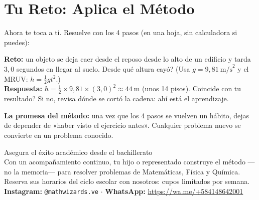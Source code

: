 \documentclass[12pt, letterpaper]{article}
\makeatletter
\newcommand{\mwcta}[2]{%
  \begin{center}
    \begin{minipage}{0.94\linewidth}
      \begin{cuadroextra}
        \centering
        {\nxheav\Large\color{mwprimario}#1}\\[8pt]
        {\small #2}\\[12pt]
        {\footnotesize\color{mwgris}
          \textbf{Instagram:} \texttt{@mathwizards.ve} \quad$\cdot$\quad
          \textbf{WhatsApp:} \url{https://wa.me/+584148642001}}
      \end{cuadroextra}
    \end{minipage}
  \end{center}
}
\makeatother
\begin{document}
\section{Tu Reto: Aplica el Método}

\noindent Ahora te toca a ti. Resuelve con los 4 pasos (en una hoja, sin calculadora si puedes):

\begin{cuadroextra}
  \small
  \textbf{Reto:} un objeto se deja caer desde el reposo desde lo alto de un edificio y tarda $3{,}0$ segundos en llegar al suelo. \textquestiondown Desde qué altura cayó? (Usa $g = 9{,}81\ \text{m/s}^2$ y el MRUV: $h = \tfrac{1}{2} g t^2$.)
  \\[4pt]
  \textbf{Respuesta:} $h = \tfrac{1}{2} \times 9{,}81 \times (3{,}0)^2 \approx 44\ \text{m}$ (unos 14 pisos). \textquestiondown Coincide con tu resultado? Si no, revisa dónde se cortó la cadena: ahí está el aprendizaje.
\end{cuadroextra}

\noindent\textbf{La promesa del método:} una vez que los 4 pasos se vuelven un hábito, dejas de depender de «haber visto el ejercicio antes». Cualquier problema nuevo se convierte en un problema conocido.

\vspace*{\fill}

\mwcta{Asegura el éxito académico desde el bachillerato}{Con un acompañamiento continuo, tu hijo o representado construye el método —no la memoria— para resolver problemas de Matemáticas, Física y Química. Reserva sus horarios del ciclo escolar con nosotros: cupos limitados por semana.}

\vspace*{\fill}
\end{document}
